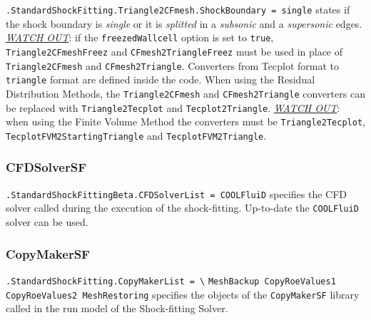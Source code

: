 \documentclass[11pt,a4paper,oneside]{article}
\begin{document}
\newline
\newline
\hspace*{1cm} \texttt{.StandardShockFitting.Triangle2CFmesh.ShockBoundary = single}
\newline
\newline
states if the shock boundary is \textit{single} or it is \textit{splitted} in a \textit{subsonic} and a \textit{supersonic} edges.
\newline
\newline
\underline{\emph{WATCH OUT}}: if the \texttt{freezedWallcell} option is set to \texttt{true}, \texttt{Triangle2CFmeshFreez} and \texttt{CFmesh2TriangleFreez} must be used in place of \texttt{Triangle2CFmesh} and \texttt{CFmesh2Triangle}.
\newline
\newline
Converters from Tecplot format to \texttt{triangle} format are defined inside the code. When using the Residual Distribution Methods, the \texttt{Triangle2CFmesh} and \texttt{CFmesh2Triangle} converters can be replaced with \texttt{Triangle2Tecplot} and \texttt{Tecplot2Triangle}.
\newline
\newline
\underline{\emph{WATCH OUT}}: when using the Finite Volume Method the converters must be \texttt{Triangle2Tecplot}, \texttt{TecplotFVM2StartingTriangle} and \texttt{TecplotFVM2Triangle}.

\subsubsection{CFDSolverSF}

\hspace*{1cm} \texttt{.StandardShockFittingBeta.CFDSolverList = COOLFluiD}
\newline
\newline
specifies the CFD solver called during the execution of the shock-fitting. Up-to-date the \texttt{COOLFluiD} solver can be used.

\subsubsection{CopyMakerSF}

\hspace*{1cm} \texttt{.StandardShockFitting.CopyMakerList = \textbackslash{}}
\newline
\hspace*{1.3cm} \texttt{MeshBackup CopyRoeValues1 CopyRoeValues2 MeshRestoring}
\newline
\newline
specifies the objects of the \texttt{CopyMakerSF} library called in the run model of the Shock-fitting Solver.
\end{document}
